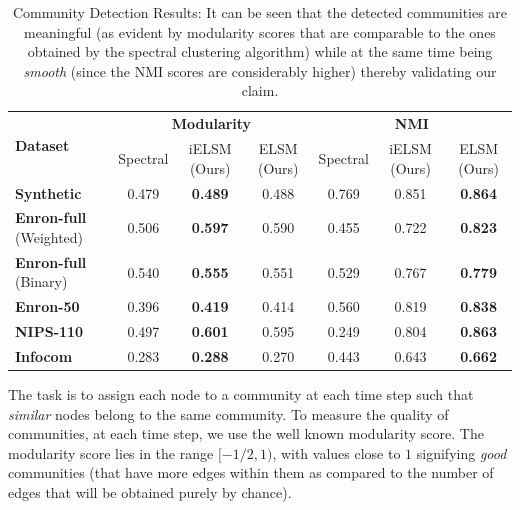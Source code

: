 \documentclass[letterpaper]{article}
\begin{document}
\begin{table}[t]
\caption{Community Detection Results: It can be seen that the detected communities are meaningful (as evident by modularity scores that are comparable to the ones obtained by the spectral clustering algorithm) while at the same time being \textit{smooth} (since the NMI scores are considerably higher) thereby validating our claim.}
\label{table:clustering_results}
\begin{center}
\begin{small}
\begin{sc}
\begin{tabular}{p{1.9cm}|ccc|ccc}
\toprule
\multirow{2}{*}{\textbf{Dataset}} & \multicolumn{3}{c|}{\textbf{Modularity}} & \multicolumn{3}{c}{\textbf{NMI}} \\
& Spectral & \textup{i}ELSM (Ours) & ELSM (Ours) & Spectral & \textup{i}ELSM (Ours) & ELSM (Ours) \\
\midrule
\textbf{Synthetic} & 0.479 & \textbf{0.489} & 0.488 & 0.769 & 0.851 & \textbf{0.864} \\
\textbf{Enron-full} \newline(Weighted)& 0.506 & \textbf{0.597} & 0.590 & 0.455 & 0.722 & \textbf{0.823} \\
\textbf{Enron-full} \newline(Binary)& 0.540 & \textbf{0.555} & 0.551 & 0.529 & 0.767 & \textbf{0.779} \\
\textbf{Enron-50}  & 0.396 & \textbf{0.419} & 0.414 & 0.560 & 0.819 & \textbf{0.838} \\
\textbf{NIPS-110}  & 0.497 & \textbf{0.601} & 0.595 & 0.249 & 0.804 & \textbf{0.863} \\
\textbf{Infocom}   & 0.283 & \textbf{0.288} & 0.270 & 0.443 & 0.643 & \textbf{0.662} \\
\bottomrule
\end{tabular}
\end{sc}
\end{small}
\end{center}
\end{table}

The task is to assign each node to a community at each time step such that \textit{similar} nodes belong to the same community. To measure the quality of communities, at each time step, we use the well known modularity score. The modularity score lies in the range $[-1/2, 1)$, with values close to $1$ signifying \textit{good} communities (that have more edges within them as compared to the number of edges that will be obtained purely by chance).
\end{document}
